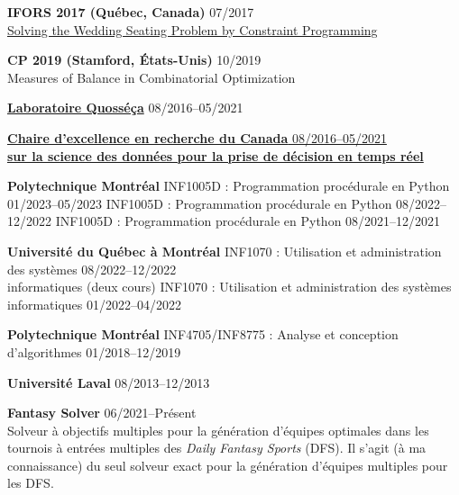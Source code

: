 \documentclass{memoir}
\begin{document}
\begin{list}{}
  \Item \textbf{IFORS 2017 (Québec, Canada)} \hfill 07/2017 \\
  \href{https://www.euro-online.org/conf/ifors2017/treat_abstract?paperid=1523}{Solving the Wedding Seating Problem by Constraint Programming}



  \Item \textbf{CP 2019 (Stamford, États-Unis)} \hfill 10/2019 \\
  Measures of Balance in Combinatorial Optimization



  \Item \href{https://www.polymtl.ca/labo-quosseca/en/members/alumni/doctoral-students}{\textbf{Laboratoire Quosséça}} \hfill 08/2016--05/2021

  \Item \href{http://cerc-datascience.polymtl.ca/person/philippe-olivier}{\textbf{Chaire d'excellence en recherche du Canada} \hfill 08/2016--05/2021 \\ \textbf{sur la science des données pour la prise de décision en temps réel}}
  



  \Item \textbf{Polytechnique Montréal}
  \BulletItem INF1005D : Programmation procédurale en Python \hfill 01/2023--05/2023
  \BulletItem INF1005D : Programmation procédurale en Python \hfill 08/2022--12/2022
  \BulletItem INF1005D : Programmation procédurale en Python \hfill 08/2021--12/2021

  \Item \textbf{Université du Québec à Montréal}
  \BulletItem INF1070 : Utilisation et administration des systèmes \hfill 08/2022--12/2022 \\ informatiques (deux cours)
  \BulletItem INF1070 : Utilisation et administration des systèmes informatiques \hfill 01/2022--04/2022



  \Item \textbf{Polytechnique Montréal}
  \BulletItem INF4705/INF8775 : Analyse et conception d'algorithmes \hfill 01/2018--12/2019

  \Item \textbf{Université Laval} \hfill 08/2013--12/2013



  \Item \textbf{Fantasy Solver} \hfill 06/2021--Présent \\
  Solveur à objectifs multiples pour la génération d'équipes optimales dans les tournois à entrées multiples des \emph{Daily Fantasy Sports} (DFS). Il s'agit (à ma connaissance) du seul solveur exact pour la génération d'équipes multiples pour les DFS.
  
\end{list}
\par
\end{document}
